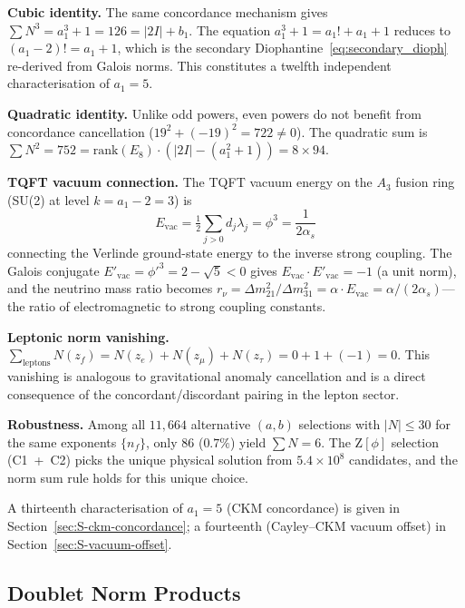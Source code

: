\documentclass[12pt,a4paper]{article}
\theoremstyle{definition}
\begin{document}
\textbf{Cubic identity.}  The same concordance mechanism gives $\sum N^3 = a_1^3 + 1 = 126 = |2I| + b_1$.  The equation $a_1^3 + 1 = a_1! + a_1 + 1$ reduces to $(a_1 - 2)! = a_1 + 1$, which is the secondary Diophantine~\eqref{eq:secondary_dioph} re-derived from Galois norms.  This constitutes a twelfth independent characterisation of $a_1 = 5$.

\textbf{Quadratic identity.}  Unlike odd powers, even powers do not benefit from concordance cancellation ($19^2 + (-19)^2 = 722 \neq 0$).  The quadratic sum is $\sum N^2 = 752 = \mathrm{rank}(E_8) \cdot (|2I| - (a_1^2+1)) = 8 \times 94$.

\textbf{TQFT vacuum connection.}  The TQFT vacuum energy on the $A_3$ fusion ring (SU(2) at level $k = a_1 - 2 = 3$) is
\begin{equation}
E_{\text{vac}} = \tfrac{1}{2}\textstyle\sum_{j > 0} d_j \lambda_j = \phi^3 = \frac{1}{2\alpha_s}
\end{equation}
connecting the Verlinde ground-state energy to the inverse strong coupling.  The Galois conjugate $E'_{\text{vac}} = \phi'^3 = 2 - \sqrt{5} < 0$ gives $E_{\text{vac}} \cdot E'_{\text{vac}} = -1$ (a unit norm), and the neutrino mass ratio becomes $r_\nu = \Delta m^2_{21}/\Delta m^2_{31} = \alpha \cdot E_{\text{vac}} = \alpha/(2\alpha_s)$---the ratio of electromagnetic to strong coupling constants.

\textbf{Leptonic norm vanishing.}  $\sum_{\text{leptons}} N(z_f) = N(z_e) + N(z_\mu) + N(z_\tau) = 0 + 1 + (-1) = 0$.  This vanishing is analogous to gravitational anomaly cancellation and is a direct consequence of the concordant/discordant pairing in the lepton sector.

\textbf{Robustness.}  Among all $11{,}664$ alternative $(a,b)$ selections with $|N| \leq 30$ for the same exponents $\{n_f\}$, only $86$ ($0.7\%$) yield $\sum N = 6$.  The $\mathrm{Z}[\phi]$ selection (C1~+~C2) picks the unique physical solution from $5.4 \times 10^8$ candidates, and the norm sum rule holds for this unique choice.

A thirteenth characterisation of $a_1 = 5$ (CKM concordance) is given in Section~\ref{sec:S-ckm-concordance}; a fourteenth (Cayley--CKM vacuum offset) in Section~\ref{sec:S-vacuum-offset}.

\subsection{Doublet Norm Products}
\label{sec:S-doublet-norms}
\end{document}
